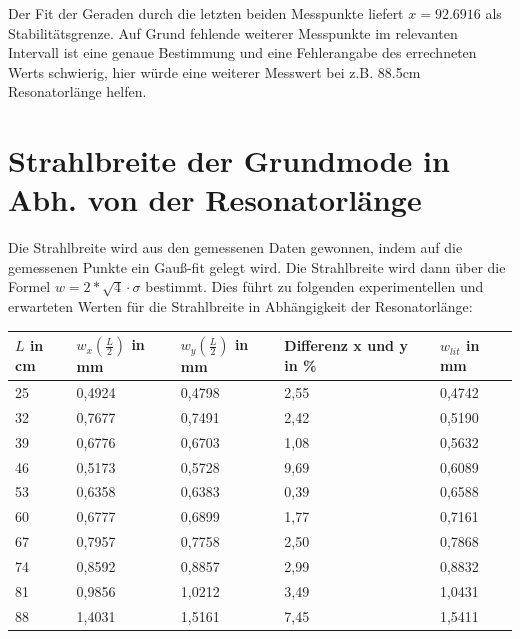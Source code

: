 \documentclass[bigchapter,colorback,accentcolor=tud4b,linedtoc,11pt]{tudreport}
\numberwithin{equation}{subsection}
\begin{document}
Der Fit der Geraden durch die letzten beiden Messpunkte liefert $x=92.6916$ als Stabilitätsgrenze. Auf Grund fehlende weiterer Messpunkte im relevanten Intervall ist eine genaue Bestimmung und eine Fehlerangabe des errechneten Werts schwierig, hier würde eine weiterer Messwert bei z.B. 88.5cm Resonatorlänge helfen.
\section{Strahlbreite der Grundmode in Abh. von der Resonatorlänge}
Die Strahlbreite wird aus den gemessenen Daten gewonnen, indem auf die gemessenen Punkte ein Gauß-fit gelegt wird. Die Strahlbreite wird dann über die Formel
$w=2*\sqrt{4}\cdot\sigma$
bestimmt. Dies führt zu folgenden experimentellen und erwarteten Werten für die Strahlbreite in Abhängigkeit der Resonatorlänge:
\begin{center}
    \begin{tabular}{ | l | l | l | l | p{4cm} |}
    \hline
    $L$ in cm & $w_x\left(\frac{L}{2}\right)$ in mm & $w_y\left(\frac{L}{2}\right)$ in mm & Differenz x und y in \% & $w_{lit}$ in mm \\ \hline
    25 & 0,4924 & 0,4798 & 2,55 & 0,4742 \\ \hline
    32 & 0,7677 & 0,7491 & 2,42 & 0,5190 \\ \hline
    39 & 0,6776 & 0,6703 & 1,08 & 0,5632 \\ \hline
    46 & 0,5173 & 0,5728 & 9,69 & 0,6089 \\ \hline
    53 & 0,6358 & 0,6383 & 0,39 & 0,6588 \\ \hline
    60 & 0,6777 & 0,6899 & 1,77 & 0,7161 \\ \hline
    67 & 0,7957 & 0,7758 & 2,50 & 0,7868 \\ \hline
    74 & 0,8592 & 0,8857 & 2,99 & 0,8832 \\ \hline
    81 & 0,9856 & 1,0212 & 3,49 & 1,0431 \\ \hline
    88 & 1,4031 & 1,5161 & 7,45 & 1,5411 \\ \hline
    \end{tabular}
\end{center}
\end{document}
